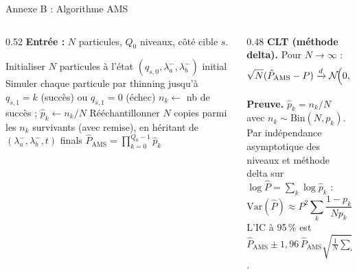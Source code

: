 \documentclass[10pt,aspectratio=169]{beamer}
\newcommand{\Var}{\mathrm{Var}}
\begin{document}
\begin{frame}{Annexe B : Algorithme AMS}
\begin{columns}[T]
\begin{column}{0.52\textwidth}
\small
\textbf{Entrée :} $N$ particules, $Q_0$ niveaux, côté cible $s$.
\begin{algorithmic}[1]
\State Initialiser $N$ particules à l'état $(q_{s,0},\lambda_a^-,\lambda_b^-)$ initial
  \State Simuler chaque particule par thinning jusqu'à $q_{s,1}=k$
         (succès) ou $q_{\bar s,1}=0$ (échec)
  \State $n_k\gets$ nb de succès ;\; $\hat p_k\gets n_k/N$
  \State Rééchantillonner $N$ copies parmi les $n_k$ survivants
         (avec remise), en héritant de $(\lambda_a^-,\lambda_b^-,t)$ finals
\EndFor
\State \Return $\hat P_\mathrm{AMS}=\prod_{k=0}^{Q_0-1}\hat p_k$
\end{algorithmic}
\end{column}
\begin{column}{0.48\textwidth}
\small
\textbf{CLT (méthode delta).} Pour $N\to\infty$ :
\[
\sqrt{N}(\hat P_\mathrm{AMS}-P)\xrightarrow{d}
\mathcal{N}\!\Bigl(0,P^2\!\sum_k\tfrac{1-p_k}{p_k}\Bigr).
\]
\textbf{Preuve.} $\hat p_k=n_k/N$ avec $n_k\sim\mathrm{Bin}(N,p_k)$. Par indépendance asymptotique des niveaux et méthode delta sur $\log\hat P=\sum_k\log\hat p_k$ :
\[
\Var(\hat P)\approx P^2\sum_k\frac{1-p_k}{N p_k}.
\]
L'IC à 95\,\% est $\hat P_\mathrm{AMS}\pm1{,}96\,\hat P_\mathrm{AMS}\sqrt{\frac{1}{N}\sum_k\frac{1-\hat p_k}{\hat p_k}}$.
\end{column}
\end{columns}
\end{frame}
\end{document}
